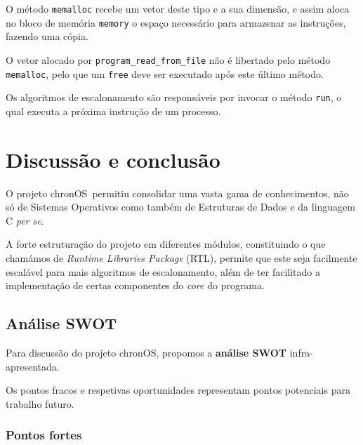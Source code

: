 \documentclass[10pt,oneside]{estiloUBI}
\newcommand{\chronOS}{\textsf{chronOS}}
\begin{document}
	O método \verb|memalloc| recebe um vetor deste tipo e a sua dimensão, e assim aloca no bloco de memória \verb|memory| o espaço necessário para armazenar as instruções, fazendo uma cópia.
	
	O vetor alocado por \verb|program_read_from_file| não é libertado pelo método \verb|memalloc|, pelo que um \verb|free| deve ser executado após este último método.
	
	Os algoritmos de escalonamento são responsáveis por invocar o método \verb|run|, o qual executa a próxima instrução de um processo.
	
	
	\chapter{Discussão e conclusão}
	\label{sec:con_futwork}
	
	O projeto \chronOS~permitiu consolidar uma vasta gama de conhecimentos, não só de Sistemas Operativos como também de Estruturas de Dados e da linguagem C \textit{per se}.
	
	A forte estruturação do projeto em diferentes módulos, constituindo o que chamámos de \textit{Runtime Libraries Package} (RTL), permite que este seja facilmente escalável para mais algoritmos de escalonamento, além de ter facilitado a implementação de certas componentes do \textit{core} do programa.
	
	
	\section{Análise SWOT}
	
	Para discussão do projeto \chronOS, propomos a \textbf{análise SWOT} infra-apresentada.
	
	Os pontos fracos e respetivas oportunidades representam pontos potenciais para trabalho futuro.
	
	\subsection{Pontos fortes}
	
\end{document}
